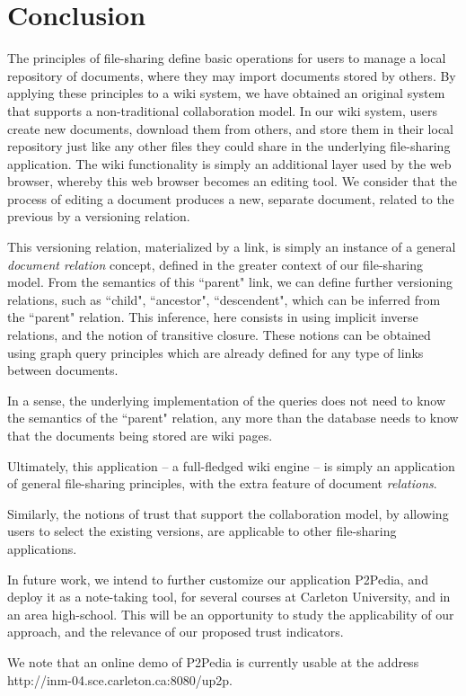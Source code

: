 \section{Conclusion}

The principles of file-sharing define basic operations for users to manage a local repository of documents, where they may import documents stored by others. By applying these principles to a wiki system, we have obtained an original system that supports a non-traditional collaboration model. In our wiki system, users create new documents, download them from others, and store them in their local repository just like any other files they could share in the underlying file-sharing application. The wiki functionality is simply an additional layer used by the web browser, whereby this web browser becomes an editing tool. We consider that the process of editing a document produces a new, separate document, related to the previous by a versioning relation. 

This versioning relation, materialized by a link, is simply an instance of a general \emph{document relation} concept, defined in the greater context of our file-sharing model. From the semantics of this ``parent" link, we can define further versioning relations, such as ``child", ``ancestor", ``descendent", which can be inferred from the ``parent" relation. This inference, here consists in using implicit inverse relations, and the notion of transitive closure. These notions can be obtained using graph query principles which are already defined for any type of links between documents.


In a sense, the underlying implementation of the queries does not need to know the semantics of the ``parent" relation, any more than the database needs to know that the documents being stored are wiki pages.

Ultimately, this application -- a full-fledged wiki engine -- is simply an application of general file-sharing principles, with the extra feature of document \emph{relations}. 

Similarly, the notions of trust that support the collaboration model, by allowing users to select the existing versions, are applicable to other file-sharing applications.

In future work, we intend to further customize our application P2Pedia, and deploy it as a note-taking tool, for several courses at Carleton University, and in an area high-school. This will be an opportunity to study the applicability of our approach, and the relevance of our proposed trust indicators.

We note that an online demo of P2Pedia is currently usable at the address http://inm-04.sce.carleton.ca:8080/up2p.